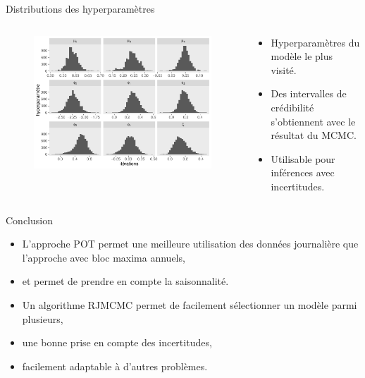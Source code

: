 \documentclass[aspectratio=169]{beamer}
\begin{document}
\begin{frame}{Distributions des hyperparamètres}
\begin{columns}
	\begin{column}{0.65\textwidth}
		\begin{figure}
		\vspace{-0.4cm}
	 		\includegraphics[height=0.9\textheight, center]{../figures/hists.pdf}
		\end{figure}
	\end{column}
	\begin{column}{0.35\textwidth}
	\begin{itemize}
	\setlength{\itemsep}{17pt}
	\item Hyperparamètres du modèle le plus visité.
	\item Des intervalles de crédibilité s'obtiennent avec le résultat du MCMC.
	\item Utilisable pour inférences avec incertitudes.
	\end{itemize}
	\end{column}
\end{columns}
\end{frame}


\begin{frame}{Conclusion}
\begin{itemize}
	\setlength{\itemsep}{17pt}
	\item L'approche POT permet une meilleure utilisation des données journalière que l'approche avec bloc maxima annuels,
	\item et permet de prendre en compte la saisonnalité.
	\item Un algorithme RJMCMC permet de facilement sélectionner un modèle parmi plusieurs,
	\item une bonne prise en compte des incertitudes,
	\item facilement adaptable à d'autres problèmes.
\end{itemize}
\end{frame}
\end{document}
